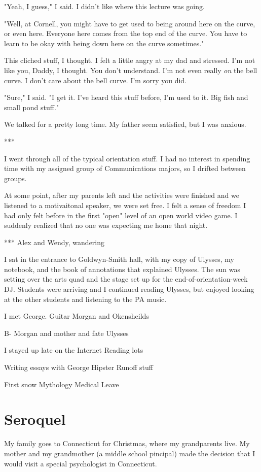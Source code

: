 \documentclass[12pt]{article}
\begin{document}
"Yeah, I guess," I said.  I didn't like where this lecture was going.

"Well, at Cornell, you might have to get used to being around here on the curve,
or even here.  Everyone here comes from the top end of the curve.  You have to
learn to be okay with being down here on the curve sometimes."

This cliched stuff, I thought.  I felt a little angry at my dad and stressed.
I'm not like you, Daddy, I thought.  You don't understand.  I'm not even really
\textit{on} the bell curve.  I don't care about the bell curve.  I'm sorry you
did.

"Sure," I said.  "I get it.  I've heard this stuff before, I'm used to it.  Big
fish and small pond stuff."

We talked for a pretty long time.  My father seem satisfied, but I was anxious.

***

I went through all of the typical orientation stuff.  I had no interest in
spending time with my assigned group of Communications majors, so I
drifted between groups. 

At some point, after my parents left and the activities were finished and we
listened to a motivaitonal speaker, we were set free.  I felt a sense of freedom
I had only felt before in the first "open" level of an open world video game.  I
suddenly realized that no one was expecting me home that night.

***
Alex and Wendy, wandering


I sat in the entrance to Goldwyn-Smith hall, with my copy of Ulysses, my
notebook, and the book of annotations that explained Ulysses.  The sun was
setting over the arts quad and the stage set up for the end-of-orientation-week
DJ.  Students were arriving and I continued reading Ulysses, but enjoyed
looking at the other students and listening to the PA music.

I met George.  Guitar
Morgan and Okensheilds 

B-
Morgan and mother and fate
Ulysses

I stayed up late on the Internet
Reading lots

Writing essays with George
Hipster Runoff stuff

First snow
Mythology
Medical Leave

\section{Seroquel}
My family goes to Connecticut for Christmas, where my grandparents live.  My
mother and my grandmother (a middle school pincipal) made the decision that I
would visit a special psychologist in Connecticut.
\end{document}
